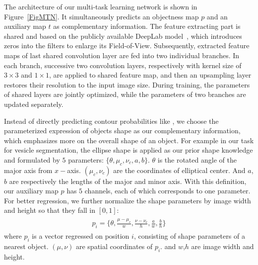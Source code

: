 The architecture of our multi-task learning network is shown in Figure~\ref{FigMTN}.
It simultaneously predicts an objectness map $p$ and an auxiliary map $t$ as complementary information.
The feature extracting part is shared and based on the publicly available DeepLab model~\cite{Chen2014a}, which introduces zeros into the filters to enlarge its Field-of-View.
Subsequently, extracted feature maps of last shared convolution layer are fed into two individual branches.
In each branch, successive two convolution layers, respectively with kernel size of $3\times3$ and $1\times1$, are applied to shared feature map, and then an upsampling layer restores their resolution to the input image size.
During training, the parameters of shared layers are jointly optimized, while the parameters of two branches are updated separately.

Instead of directly predicting contour probabilities like \cite{Chen2016a,Xu2016}, we choose the parameterized expression of objects shape as our complementary information, which emphasizes more on the overall shape of an object.
For example in our task for vesicle segmentation, the ellipse shape is applied as our prior shape knowledge and formulated by $5$ parameters: $\{\theta, \mu_c, \nu_c, a, b\}$.
$\theta$ is the rotated angle of the major axis from $x-$axis.
$(\mu_c, \nu_c)$ are the coordinates of elliptical center.
And $a$, $b$ are respectively the lengths of the major and minor axis.
With this definition, our auxiliary map $p$ has $5$ channels, each of which corresponds to one parameter.
For better regression, we further normalize the shape parameters by image width and height so that they fall in $[0,1]$:
\begin{eqnarray}\label{EqMax}
\begin{aligned}
p_i= \{\theta,\frac{\mu-\mu_c}{w},\frac{\nu-\nu_c}{h},\frac{a}{w},\frac{b}{h}\}
\end{aligned}
\end{eqnarray}
where $p_i$ is a vector regressed on position $i$, consisting of shape parameters of a nearest object.
$(\mu, \nu)$ are spatial coordinates of $p_i$.
and $w$,$h$ are image width and height.

